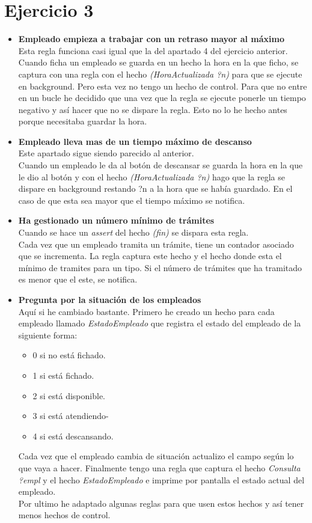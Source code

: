\documentclass[10pt,spanish]{article}
\begin{document}
	\section{Ejercicio 3}
	\begin{itemize}
		\item \textbf{Empleado empieza a trabajar con un retraso mayor al máximo}\\
		Esta regla funciona casi igual que la del apartado 4 del ejercicio anterior.
		\\Cuando ficha un empleado se guarda en un hecho la hora en la que ficho, se captura con una regla con el hecho \textit{(HoraActualizada ?n)} para que se ejecute en background. Pero esta vez no tengo un hecho de control. Para que no entre en un bucle he decidido que una vez que la regla se ejecute ponerle un tiempo negativo y así hacer que no se dispare la regla.
		Esto no lo he hecho antes porque necesitaba guardar la hora.
		\item \textbf{Empleado lleva mas de un tiempo máximo de descanso}\\
		Este apartado sigue siendo parecido al anterior.
		\\Cuando un empleado le da al botón de descansar se guarda la hora en la que le dio al botón y con el hecho \textit{(HoraActualizada ?n)} hago que la regla se dispare en background restando ?n a la hora que se había guardado. En el caso de que esta sea mayor que el tiempo máximo se notifica.
		\item \textbf{Ha gestionado un número mínimo de trámites}\\
		Cuando se hace un \textit{assert} del hecho \textit{(fin)} se dispara esta regla.\\
		Cada vez que un empleado tramita un trámite, tiene un contador asociado que se incrementa.
		La regla captura este hecho y el hecho donde esta el mínimo de tramites para un tipo. Si el número de trámites que ha tramitado es menor que el este, se notifica.
		\item \textbf{Pregunta por la situación de los empleados}\\
		Aquí si he cambiado bastante. Primero he creado un hecho para cada empleado llamado \textit{EstadoEmpleado} que registra el estado del empleado de la siguiente forma:
		\begin{itemize}
			\item 0 si no está fichado.
			\item 1 si está fichado.
			\item 2 si está disponible.
			\item 3 si está atendiendo-
			\item 4 si está descansando.
		\end{itemize}
		Cada vez que el empleado cambia de situación actualizo el campo según lo que vaya a hacer.
		Finalmente tengo una regla que captura el hecho \textit{Consulta ?empl} y el hecho \textit{EstadoEmpleado} e imprime por pantalla el estado actual del empleado. \\
		Por ultimo he adaptado algunas reglas para que usen estos hechos y así tener menos hechos de control.

	\end{itemize}
\end{document}
